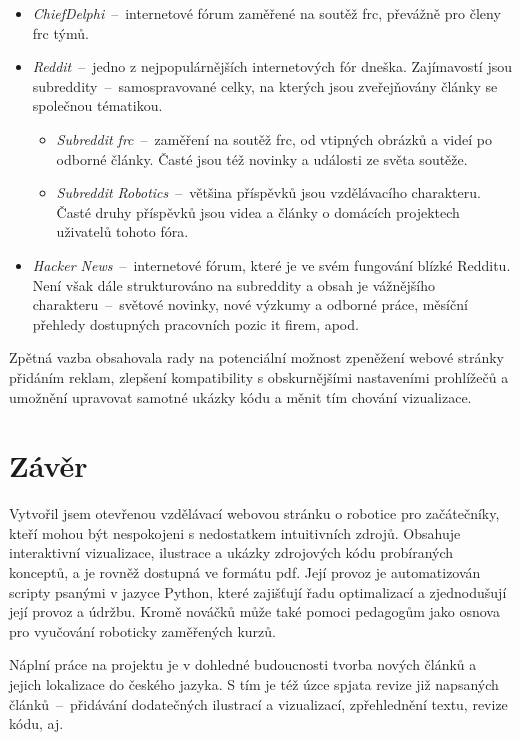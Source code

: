 \documentclass[a4paper, 12pt, twoside]{article}
\begin{document}
  {\parskip=0pt
  \begin{itemize}[topsep=\itemsep]
    \item \emph{ChiefDelphi}~--~internetové fórum zaměřené na soutěž \gls{frc}, převážně pro členy \gls{frc} týmů.
    \item \emph{Reddit}~--~jedno z nejpopulárnějších internetových fór dneška. Zajímavostí jsou subreddity~--~samospravované celky, na kterých jsou zveřejňovány články se společnou tématikou.
    \begin{itemize}[topsep=0pt]
      \item \emph{Subreddit \gls{frc}}~--~zaměření na soutěž \gls{frc}, od vtipných obrázků a videí po odborné články. Časté jsou též novinky a události ze světa soutěže.
      \item \emph{Subreddit Robotics}~--~většina příspěvků jsou vzdělávacího charakteru. Časté druhy příspěvků jsou videa a články o domácích projektech uživatelů tohoto fóra.
    \end{itemize}
    \item \emph{Hacker News}~--~internetové fórum, které je ve svém fungování blízké Redditu. Není však dále strukturováno na subreddity a obsah je vážnějšího charakteru~--~světové novinky, nové výzkumy a odborné práce, měsíční přehledy dostupných pracovních pozic \gls{it} firem, apod.
  \end{itemize}}

  Zpětná vazba obsahovala rady na potenciální možnost zpeněžení webové stránky přidáním reklam, zlepšení kompatibility s obskurnějšími nastaveními prohlížečů a umožnění upravovat samotné ukázky kódu a měnit tím chování vizualizace.

  \cleardoublepage

  \section{Závěr}
  Vytvořil jsem otevřenou vzdělávací webovou stránku o robotice pro začátečníky, kteří mohou být nespokojeni s nedostatkem intuitivních zdrojů. Obsahuje interaktivní vizualizace, ilustrace a ukázky zdrojových kódu probíraných konceptů, a je rovněž dostupná ve formátu \gls{pdf}. Její provoz je automatizován scripty psanými v jazyce Python, které zajišťují řadu optimalizací a zjednodušují její provoz a údržbu. Kromě nováčků může také pomoci pedagogům jako osnova pro vyučování roboticky zaměřených kurzů.

  Náplní práce na projektu je v dohledné budoucnosti tvorba nových článků a jejich lokalizace do českého jazyka. S tím je též úzce spjata revize již napsaných článků~--~přidávání dodatečných ilustrací a vizualizací, zpřehlednění textu, revize kódu, aj.
\end{document}
